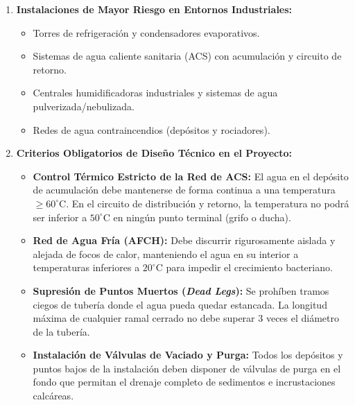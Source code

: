 \documentclass{report}
\begin{document}
\begin{enumerate}

    \item \textbf{Instalaciones de Mayor Riesgo en Entornos Industriales:}

          \begin{itemize}

              \item Torres de refrigeración y condensadores evaporativos.

              \item Sistemas de agua caliente sanitaria (ACS) con acumulación y circuito de retorno.

              \item Centrales humidificadoras industriales y sistemas de agua pulverizada/nebulizada.

              \item Redes de agua contraincendios (depósitos y rociadores).

          \end{itemize}

    \item \textbf{Criterios Obligatorios de Diseño Técnico en el Proyecto:}

          \begin{itemize}

              \item \textbf{Control Térmico Estricto de la Red de ACS:} El agua en el depósito de acumulación debe mantenerse de forma continua a una temperatura $\ge 60^\circ\text{C}$. En el circuito de distribución y retorno, la temperatura no podrá ser inferior a $50^\circ\text{C}$ en ningún punto terminal (grifo o ducha).

              \item \textbf{Red de Agua Fría (AFCH):} Debe discurrir rigurosamente aislada y alejada de focos de calor, manteniendo el agua en su interior a temperaturas inferiores a $20^\circ\text{C}$ para impedir el crecimiento bacteriano.

              \item \textbf{Supresión de Puntos Muertos (\textit{Dead Legs}):} Se prohíben tramos ciegos de tubería donde el agua pueda quedar estancada. La longitud máxima de cualquier ramal cerrado no debe superar $3$ veces el diámetro de la tubería.

              \item \textbf{Instalación de Válvulas de Vaciado y Purga:} Todos los depósitos y puntos bajos de la instalación deben disponer de válvulas de purga en el fondo que permitan el drenaje completo de sedimentos e incrustaciones calcáreas.


\end{itemize}
\end{enumerate}
\end{document}
